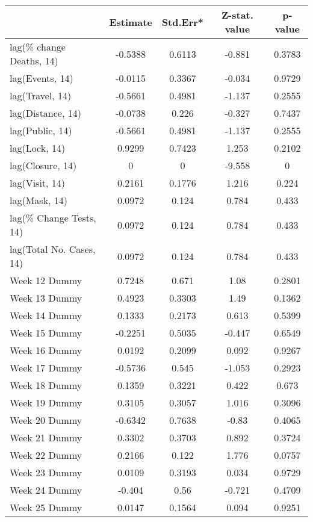 \begingroup\tiny
\begin{longtable}{lcccc}
  \toprule
 & Estimate & Std.Err* & Z-stat. value & p-value \\ 
  \midrule
lag(\% change Deaths, 14) & -0.5388 & 0.6113 & -0.881 & 0.3783 \\ 
  lag(Events, 14) & -0.0115 & 0.3367 & -0.034 & 0.9729 \\ 
  lag(Travel, 14) & -0.5661 & 0.4981 & -1.137 & 0.2555 \\ 
  lag(Distance, 14) & -0.0738 & 0.226 & -0.327 & 0.7437 \\ 
  lag(Public, 14) & -0.5661 & 0.4981 & -1.137 & 0.2555 \\ 
  lag(Lock, 14) & 0.9299 & 0.7423 & 1.253 & 0.2102 \\ 
  lag(Closure, 14) & 0 & 0 & -9.558 & 0 \\ 
  lag(Visit, 14) & 0.2161 & 0.1776 & 1.216 & 0.224 \\ 
  lag(Mask, 14) & 0.0972 & 0.124 & 0.784 & 0.433 \\ 
  lag(\% Change Tests, 14) & 0.0972 & 0.124 & 0.784 & 0.433 \\ 
  lag(Total No. Cases, 14) & 0.0972 & 0.124 & 0.784 & 0.433 \\ 
  Week 12 Dummy & 0.7248 & 0.671 & 1.08 & 0.2801 \\ 
  Week 13 Dummy & 0.4923 & 0.3303 & 1.49 & 0.1362 \\ 
  Week 14 Dummy & 0.1333 & 0.2173 & 0.613 & 0.5399 \\ 
  Week 15 Dummy & -0.2251 & 0.5035 & -0.447 & 0.6549 \\ 
  Week 16 Dummy & 0.0192 & 0.2099 & 0.092 & 0.9267 \\ 
  Week 17 Dummy & -0.5736 & 0.545 & -1.053 & 0.2923 \\ 
  Week 18 Dummy & 0.1359 & 0.3221 & 0.422 & 0.673 \\ 
  Week 19 Dummy & 0.3105 & 0.3057 & 1.016 & 0.3096 \\ 
  Week 20 Dummy & -0.6342 & 0.7638 & -0.83 & 0.4065 \\ 
  Week 21 Dummy & 0.3302 & 0.3703 & 0.892 & 0.3724 \\ 
  Week 22 Dummy & 0.2166 & 0.122 & 1.776 & 0.0757 \\ 
  Week 23 Dummy & 0.0109 & 0.3193 & 0.034 & 0.9729 \\ 
  Week 24 Dummy & -0.404 & 0.56 & -0.721 & 0.4709 \\ 
  Week 25 Dummy & 0.0147 & 0.1564 & 0.094 & 0.9251 \\ 

\end{longtable}

